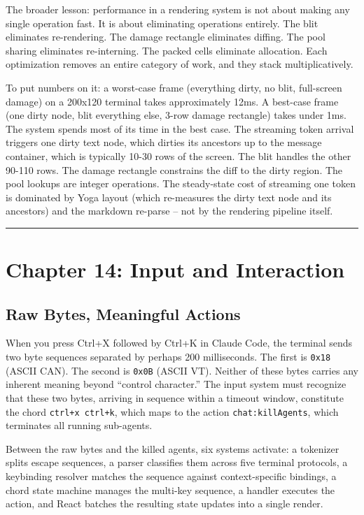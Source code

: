\documentclass[
  english,
  11pt,
  letterpaper,
]{book}
\begin{document}
The broader lesson: performance in a rendering system is not about
making any single operation fast. It is about eliminating operations
entirely. The blit eliminates re-rendering. The damage rectangle
eliminates diffing. The pool sharing eliminates re-interning. The packed
cells eliminate allocation. Each optimization removes an entire category
of work, and they stack multiplicatively.

To put numbers on it: a worst-case frame (everything dirty, no blit,
full-screen damage) on a 200x120 terminal takes approximately 12ms. A
best-case frame (one dirty node, blit everything else, 3-row damage
rectangle) takes under 1ms. The system spends most of its time in the
best case. The streaming token arrival triggers one dirty text node,
which dirties its ancestors up to the message container, which is
typically 10-30 rows of the screen. The blit handles the other 90-110
rows. The damage rectangle constrains the diff to the dirty region. The
pool lookups are integer operations. The steady-state cost of streaming
one token is dominated by Yoga layout (which re-measures the dirty text
node and its ancestors) and the markdown re-parse -- not by the
rendering pipeline itself.

\begin{center}\rule{0.5\linewidth}{0.5pt}\end{center}

\chapter{Chapter 14: Input and
Interaction}\label{chapter-14-input-and-interaction}

\section{Raw Bytes, Meaningful
Actions}\label{raw-bytes-meaningful-actions}

When you press Ctrl+X followed by Ctrl+K in Claude Code, the terminal
sends two byte sequences separated by perhaps 200 milliseconds. The
first is \texttt{0x18} (ASCII CAN). The second is \texttt{0x0B} (ASCII
VT). Neither of these bytes carries any inherent meaning beyond
``control character.'' The input system must recognize that these two
bytes, arriving in sequence within a timeout window, constitute the
chord \texttt{ctrl+x\ ctrl+k}, which maps to the action
\texttt{chat:killAgents}, which terminates all running sub-agents.

Between the raw bytes and the killed agents, six systems activate: a
tokenizer splits escape sequences, a parser classifies them across five
terminal protocols, a keybinding resolver matches the sequence against
context-specific bindings, a chord state machine manages the multi-key
sequence, a handler executes the action, and React batches the resulting
state updates into a single render.
\end{document}
